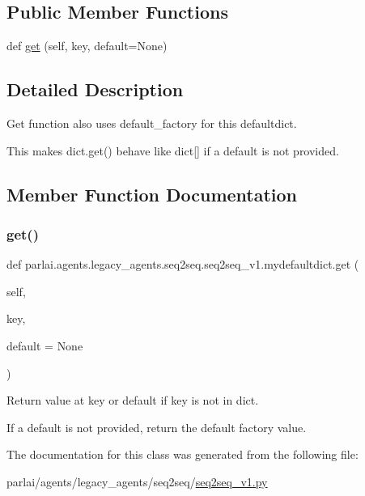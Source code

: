 \subsection*{Public Member Functions}
\begin{DoxyCompactItemize}
\item 
def \hyperlink{classparlai_1_1agents_1_1legacy__agents_1_1seq2seq_1_1seq2seq__v1_1_1mydefaultdict_aa078ac7ad7ce0d11a8aba0834acb4831}{get} (self, key, default=None)
\end{DoxyCompactItemize}


\subsection{Detailed Description}
\begin{DoxyVerb}Get function also uses default_factory for this defaultdict.

This makes dict.get() behave like dict[] if a default is not provided.
\end{DoxyVerb}
 

\subsection{Member Function Documentation}
\mbox{\label{classparlai_1_1agents_1_1legacy__agents_1_1seq2seq_1_1seq2seq__v1_1_1mydefaultdict_aa078ac7ad7ce0d11a8aba0834acb4831}} 
\subsubsection{\texorpdfstring{get()}{get()}}
{\footnotesize\ttfamily def parlai.\+agents.\+legacy\+\_\+agents.\+seq2seq.\+seq2seq\+\_\+v1.\+mydefaultdict.\+get (\begin{DoxyParamCaption}\item[{}]{self,  }\item[{}]{key,  }\item[{}]{default = {\ttfamily None} }\end{DoxyParamCaption})}

\begin{DoxyVerb}Return value at key or default if key is not in dict.

If a default is not provided, return the default factory value.
\end{DoxyVerb}
 

The documentation for this class was generated from the following file\+:\begin{DoxyCompactItemize}
\item 
parlai/agents/legacy\+\_\+agents/seq2seq/\hyperlink{seq2seq__v1_8py}{seq2seq\+\_\+v1.\+py}\end{DoxyCompactItemize}
